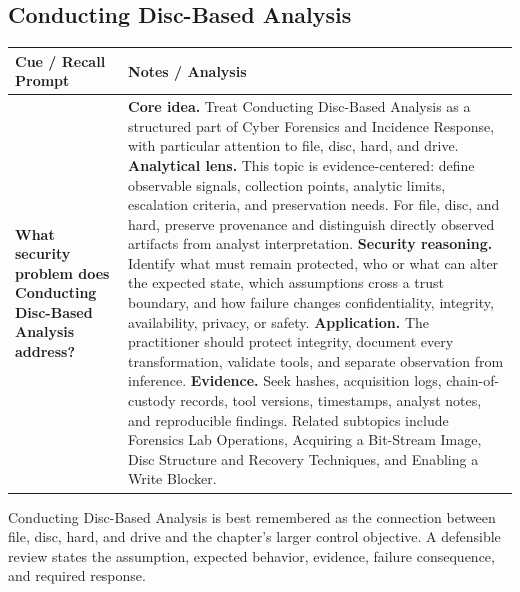 \documentclass[11pt]{article}
\newcommand{\CornellHeader}{%
\rowcolor{Navy}\color{white}\bfseries Cue / Recall Prompt & \color{white}\bfseries Notes / Analysis\\\hline}
\newcommand{\CornellRow}[2]{%
\cellcolor{CueGray}\RaggedRight\textbf{#1} & \RaggedRight #2\\\hline}
\begin{document}
\subsection*{Conducting Disc-Based Analysis}
\begin{longtable}{>{\RaggedRight\arraybackslash}p{}|>{\RaggedRight\arraybackslash}p{}}
\CornellHeader
\CornellRow{What security problem does Conducting Disc-Based Analysis address?}{\textbf{Core idea.} Treat Conducting Disc-Based Analysis as a structured part of Cyber Forensics and Incidence Response, with particular attention to file, disc, hard, and drive. \textbf{Analytical lens.} This topic is evidence-centered: define observable signals, collection points, analytic limits, escalation criteria, and preservation needs. For file, disc, and hard, preserve provenance and distinguish directly observed artifacts from analyst interpretation. \textbf{Security reasoning.} Identify what must remain protected, who or what can alter the expected state, which assumptions cross a trust boundary, and how failure changes confidentiality, integrity, availability, privacy, or safety. \textbf{Application.} The practitioner should protect integrity, document every transformation, validate tools, and separate observation from inference. \textbf{Evidence.} Seek hashes, acquisition logs, chain-of-custody records, tool versions, timestamps, analyst notes, and reproducible findings. Related subtopics include Forensics Lab Operations, Acquiring a Bit-Stream Image, Disc Structure and Recovery Techniques, and Enabling a Write Blocker.}
\end{longtable}
\begin{topicsummary}
Conducting Disc-Based Analysis is best remembered as the connection between file, disc, hard, and drive and the chapter's larger control objective. A defensible review states the assumption, expected behavior, evidence, failure consequence, and required response.
\end{topicsummary}
\end{document}

